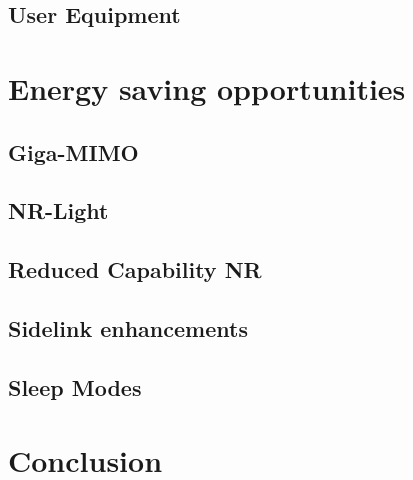 \documentclass[11pt,a4paper]{article}
\begin{document}
\subsection{User Equipment}\label{subsec:UEConsumption}


\section{Energy saving opportunities}\label{sec:opportunities}


\subsection{Giga-MIMO}\label{subsec:gigamimo}
\subsection{NR-Light}\label{subsec:nrlight}
\subsection{Reduced Capability NR}\label{subsec:RedCap}
\subsection{Sidelink enhancements}\label{subsec:sidelink}
\subsection{Sleep Modes}\label{subsec:sleep}

\section{Conclusion}\label{sec:conclusion}


\clearpage

\appendix
\printnoidxglossary[type=\acronymtype,nonumberlist]

\renewcommand*{\refname}{\section{References}}
{}
\end{document}
